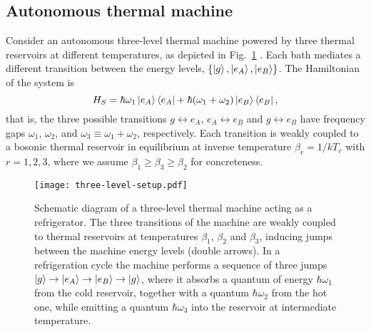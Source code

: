 \documentclass[aps,prx,twocolumn,showpacs,floatfix,superscriptaddress,graphics,longbibliography]{revtex4-1}
\begin{document}
\subsection{Autonomous thermal machine}

Consider an  autonomous three-level thermal machine powered by three thermal reservoirs at different 
temperatures, as depicted in Fig.~\ref{F-Threelevel} \cite{Scovil,Geusic, CorreaSqz, Palao, Kosloff}. Each bath mediates a different transition between the energy levels, $\{\ket{g}, \ket{e_A}, \ket{e_B}\}$. 
The Hamiltonian of the system is
\begin{equation}
H_S = \hbar \omega_1 \ket{e_A}\bra{e_A}  +  \hbar (\omega_1 + \omega_2) \ket{e_B}\bra{e_B},
\end{equation}
that is, the three possible transitions $g \leftrightarrow e_A$, $e_A \leftrightarrow e_B$ and $g \leftrightarrow e_B$ have frequency gaps 
$ \omega_1$, $\omega_2$, and $\omega_3 \equiv \omega_1 + \omega_2$, respectively. Each transition is weakly coupled 
to a bosonic thermal reservoir in equilibrium at inverse temperature $\beta_r = 1/ k T_r$ with $r= 1, 2, 3$, where we assume 
$\beta_1 \geq \beta_3 \geq \beta_2$ for concreteness. 
\begin{figure}[t]
\begin{center}
\texttt{[image: three-level-setup.pdf]}
\caption{Schematic diagram of a three-level thermal machine acting as a refrigerator. The three transitions of the machine are weakly coupled to 
thermal reservoirs at temperatures $\beta_1$, $\beta_2$ and $\beta_3$, inducing jumps between the machine energy levels (double arrows). 
In a refrigeration cycle the machine performs a sequence of three jumps $\ket{g} \rightarrow \ket{e_A} \rightarrow \ket{e_B} \rightarrow \ket{g}$, 
where it absorbs a quantum of energy $\hbar \omega_1$ from the cold reservoir, together with a quantum $\hbar \omega_2$ from the hot one, while 
emitting a quantum $\hbar \omega_3$ into the reservoir at intermediate temperature.} 
\label{F-Threelevel}
\end{center}
\end{figure}
\end{document}
